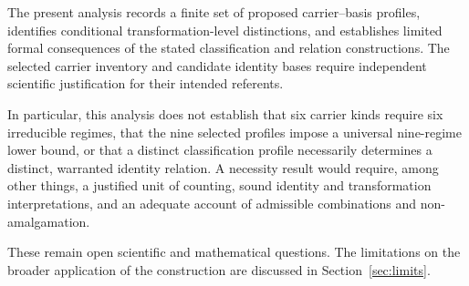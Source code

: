 The present analysis records a finite set of proposed carrier--basis
profiles, identifies conditional transformation-level distinctions,
and establishes limited formal consequences of the stated
classification and relation constructions.
The selected carrier inventory and candidate identity bases require
independent scientific justification for their intended referents.

In particular, this analysis does not establish that six carrier kinds
require six irreducible regimes, that the nine selected profiles impose
a universal nine-regime lower bound, or that a distinct classification
profile necessarily determines a distinct, warranted identity relation.
A necessity result would require, among other things, a justified unit
of counting, sound identity and transformation interpretations,
and an adequate account of admissible combinations and non-amalgamation.

These remain open scientific and mathematical questions.
The limitations on the broader application of the construction
are discussed in Section~\ref{sec:limits}.
